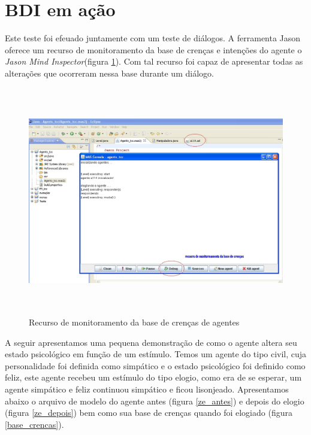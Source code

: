 \section{BDI em ação}
Este teste foi efeuado juntamente com um teste de diálogos. A ferramenta Jason oferece um recurso de monitoramento da base de crenças e intenções do agente o \emph{Jason Mind Inspector}(figura \ref{debug}). Com tal recurso foi capaz de apresentar todas as alterações que ocorreram nessa base durante um diálogo.
\begin{figure}
\centering
\includegraphics [height=10cm]{figuras/rodando_elogio_jose.jpg}
\caption{Recurso de monitoramento da base de crenças de agentes}
\label{debug}
\end{figure}

A seguir apresentamos uma pequena demonstração de como o agente altera seu estado psicológico em função de um estímulo.
Temos um agente do tipo civil, cuja personalidade foi definida como simpático e o estado psicológico foi definido como feliz, este agente recebeu um estímulo do tipo elogio, como era de se esperar, um agente simpático e feliz continuou simpático e ficou lisonjeado. Apresentamos abaixo o arquivo de modelo do agente antes (figura \ref{ze_antes}) e depois do elogio (figura \ref{ze_depois}) bem como sua base de crenças quando foi elogiado (figura \ref{base_crencas}).

